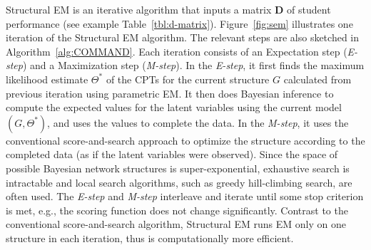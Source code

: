 \documentclass{edm_template}
\begin{document}
Structural EM is an iterative algorithm that  inputs a matrix $\mathbf{D}$ of student performance (see example Table~\ref{tbl:d-matrix}). %
Figure~\ref{fig:sem} illustrates one iteration of the Structural EM algorithm. The relevant steps are also sketched in Algorithm~\ref{alg:COMMAND}. 
Each iteration consists of an Expectation step (\emph{E-step}) and a Maximization step (\emph{M-step}). 
In the \emph{E-step}, it first finds the maximum likelihood estimate $\Theta^*$ of the CPTs 
for the current structure $G$ calculated from previous iteration using parametric EM. %
It then does Bayesian inference to compute the expected values for the latent variables using the current model $(G,\Theta^*)$, 
and uses the values to complete the data.
In the \emph{M-step}, it uses the conventional score-and-search approach to optimize the structure according to the completed data (as if the latent variables were observed).
Since the space of possible Bayesian network structures is super-exponential, 
exhaustive search is intractable and local search algorithms, such as greedy hill-climbing search, are often used.
The \emph{E-step} and \emph{M-step} interleave and iterate until some stop criterion is met, e.g., the scoring function does not change significantly.
Contrast to the conventional score-and-search algorithm, Structural EM runs EM only on one structure in each iteration, thus is computationally more efficient.
\end{document}
